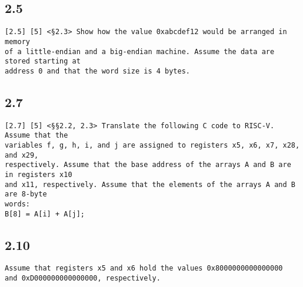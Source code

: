 \documentclass[11pt]{article}
\begin{document}
\subsection*{2.5}
\begin{verbatim}
[2.5] [5] <§2.3> Show how the value 0xabcdef12 would be arranged in memory 
of a little-endian and a big-endian machine. Assume the data are stored starting at 
address 0 and that the word size is 4 bytes.
\end{verbatim}

\subsection*{2.7}
\begin{verbatim}
[2.7] [5] <§§2.2, 2.3> Translate the following C code to RISC-V. Assume that the 
variables f, g, h, i, and j are assigned to registers x5, x6, x7, x28, and x29, 
respectively. Assume that the base address of the arrays A and B are in registers x10
and x11, respectively. Assume that the elements of the arrays A and B are 8-byte 
words:
B[8] = A[i] + A[j];
\end{verbatim}

\subsection*{2.10}
\begin{verbatim}
Assume that registers x5 and x6 hold the values 0x8000000000000000
and 0xD000000000000000, respectively.
\end{verbatim}
\end{document}

